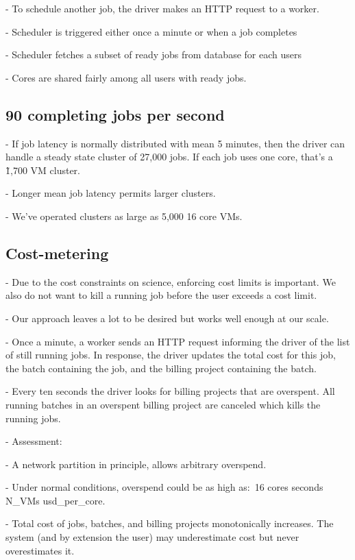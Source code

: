 \documentclass[10pt,a4paper%
]{article}
\begin{document}
    - To schedule another job, the driver makes an HTTP request to a worker.

    - Scheduler is triggered either once a minute or when a job completes

      - Scheduler fetches a subset of ready jobs from database for each users

      - Cores are shared fairly among all users with ready jobs.

\subsection{90 completing jobs per second}

    - If job latency is normally distributed with mean 5 minutes, then the driver can handle a steady state cluster of 27,000 jobs. If each job uses one core, that’s a \~1,700 VM cluster.

    - Longer mean job latency permits larger clusters.

    - We’ve operated clusters as large as 5,000 16 core VMs.

\subsection{Cost-metering}

    - Due to the cost constraints on science, enforcing cost limits is important. We also do not want to kill a running job before the user exceeds a cost limit.

    - Our approach leaves a lot to be desired but works well enough at our scale.

    - Once a minute, a worker sends an HTTP request informing the driver of the list of still running jobs. In response, the driver updates the total cost for this job, the batch containing the job, and the billing project containing the batch.

    - Every ten seconds the driver looks for billing projects that are overspent. All running batches in an overspent billing project are canceled which kills the running jobs.

    - Assessment:

      - A network partition in principle, allows arbitrary overspend.

      - Under normal conditions, overspend could be as high as:\
        16 cores  seconds \* N\_VMs \* usd\_per\_core.

      - Total cost of jobs, batches, and billing projects monotonically increases. The system (and by extension the user) may underestimate cost but never overestimates it.
\end{document}
